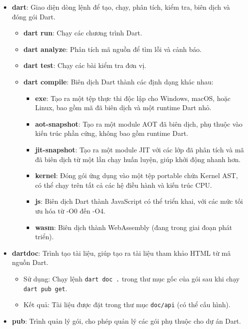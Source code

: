 \documentclass[../DoAn.tex]{subfiles}
\numberwithin{figure}{chapter}
\begin{document}
\begin{itemize}
\begin{itemize}
    \item \textbf{dart}: Giao diện dòng lệnh để tạo, chạy, phân tích, kiểm tra, biên dịch và đóng gói Dart.
    \begin{itemize}
        \item \textbf{dart run}: Chạy các chương trình Dart.
        \item \textbf{dart analyze}: Phân tích mã nguồn để tìm lỗi và cảnh báo.
        \item \textbf{dart test}: Chạy các bài kiểm tra đơn vị.
        \item \textbf{dart compile}: Biên dịch Dart thành các định dạng khác nhau:
        \begin{itemize}
            \item \textbf{exe}: Tạo ra một tệp thực thi độc lập cho Windows, macOS, hoặc Linux, bao gồm mã đã biên dịch và một runtime Dart nhỏ.
            \item \textbf{aot-snapshot}: Tạo ra một module AOT đã biên dịch, phụ thuộc vào kiến trúc phần cứng, không bao gồm runtime Dart.
            \item \textbf{jit-snapshot}: Tạo ra một module JIT với các lớp đã phân tích và mã đã biên dịch từ một lần chạy huấn luyện, giúp khởi động nhanh hơn.
            \item \textbf{kernel}: Đóng gói ứng dụng vào một tệp portable chứa Kernel AST, có thể chạy trên tất cả các hệ điều hành và kiến trúc CPU.
            \item \textbf{js}: Biên dịch Dart thành JavaScript có thể triển khai, với các mức tối ưu hóa từ -O0 đến -O4.
            \item \textbf{wasm}: Biên dịch thành WebAssembly (đang trong giai đoạn phát triển).
        \end{itemize}
    \end{itemize}
    \item \textbf{dartdoc}: Trình tạo tài liệu, giúp tạo ra tài liệu tham khảo HTML từ mã nguồn Dart.
    \begin{itemize}
        \item Sử dụng: Chạy lệnh \texttt{dart doc .} trong thư mục gốc của gói sau khi chạy \texttt{dart pub get}.
        \item Kết quả: Tài liệu được đặt trong thư mục \texttt{doc/api} (có thể cấu hình).
    \end{itemize}
    \item \textbf{pub}: Trình quản lý gói, cho phép quản lý các gói phụ thuộc cho dự án Dart.

\end{itemize}
\end{itemize}
\end{document}
